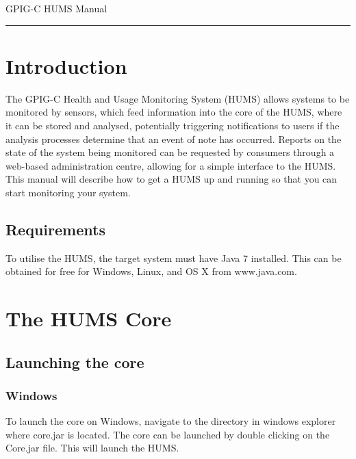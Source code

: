 \documentclass[10pt,a4paper]{article}
\begin{document}
\begin{center}
{\vspace*{-0.7cm}
\Huge GPIG-C HUMS Manual}
\vspace*{0.3cm}

\end{center}
\vspace*{0.4cm}
\hrule
\vspace*{0.4cm}

\tableofcontents

\section{Introduction}

The GPIG-C Health and Usage Monitoring System (HUMS) allows systems to be monitored by sensors, which feed information into the core of the HUMS, where it can be stored and analysed, potentially triggering notifications to users if the analysis processes determine that an event of note has occurred. Reports on the state of the system being monitored can be requested by consumers through a web-based administration centre, allowing for a simple interface to the HUMS. This manual will describe how to get a HUMS up and running so that you can start monitoring your system.

\subsection{Requirements}

To utilise the HUMS, the target system must have Java 7 installed. This can be obtained for free for Windows, Linux, and OS X from www.java.com.

\section{The HUMS Core}
\label{sec:launching}

\subsection{Launching the core}
\subsubsection{Windows}
To launch the core on Windows, navigate to the directory in windows explorer where core.jar is located. The core can be launched by double clicking on the Core.jar file. This will launch the HUMS.
\end{document}
